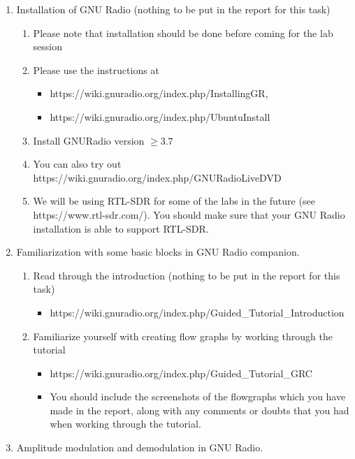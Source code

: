 \begin{enumerate}
\item Installation of GNU Radio (nothing to be put in the report for this task)
    \begin{enumerate}
    \item Please note that installation should be done before coming for the lab session
    \item Please use the instructions at 
    \begin{itemize}
        \item https://wiki.gnuradio.org/index.php/InstallingGR, 
        \item https://wiki.gnuradio.org/index.php/UbuntuInstall
    \end{itemize}
    \item Install GNURadio version $\geq 3.7$
    \item You can also try out https://wiki.gnuradio.org/index.php/GNURadioLiveDVD
    \item We will be using RTL-SDR for some of the labs in the future (see https://www.rtl-sdr.com/). You should make sure that your GNU Radio installation is able to support RTL-SDR.
    \end{enumerate}
\item Familiarization with some basic blocks in GNU Radio companion.
    \begin{enumerate}
    \item Read through the introduction (nothing to be put in the report for this task)
    \begin{itemize}
    \item https://wiki.gnuradio.org/index.php/Guided\_Tutorial\_Introduction
    \end{itemize}
    \item Familiarize yourself with creating flow graphs by working through the tutorial 
    \begin{itemize}
    \item https://wiki.gnuradio.org/index.php/Guided\_Tutorial\_GRC
    \item You should include the screenshots of the flowgraphs which you have made in the report, along with any comments or doubts that you had when working through the tutorial.
    \end{itemize}
    \end{enumerate}
\item Amplitude modulation and demodulation in GNU Radio.
    \begin{enumerate}

\end{enumerate}
\end{enumerate}
